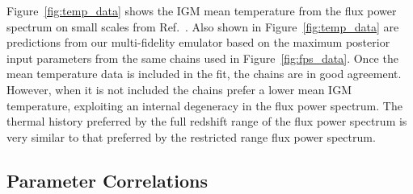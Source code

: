 Figure~\ref{fig:temp_data} shows the IGM mean temperature from the flux power spectrum on small scales from Ref.~\cite{2021MNRAS.506.4389G}.
Also shown in Figure~\ref{fig:temp_data} are predictions from our multi-fidelity emulator based on the maximum posterior input parameters from the same chains used in Figure~\ref{fig:fps_data}. Once the mean temperature data is included in the fit, the chains are in good agreement. However, when it is not included the chains prefer a lower mean IGM temperature, exploiting an internal degeneracy in the flux power spectrum. The thermal history preferred by the full redshift range of the flux power spectrum is very similar to that preferred by the restricted range flux power spectrum. 

\subsection{Parameter Correlations}
\label{sec:correlations}

